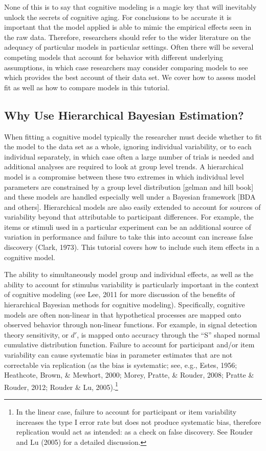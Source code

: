 \documentclass[
  english,
  ,man,floatsintext]{apa6}
\begin{document}
None of this is to say that cognitive modeling is a magic key that will inevitably unlock the secrets of cognitive aging. For conclusions to be accurate it is important that the model applied is able to mimic the empirical effects seen in the raw data. Therefore, researchers should refer to the wider literature on the adequacy of particular models in particular settings. Often there will be several competing models that account for behavior with different underlying assumptions, in which case researchers may consider comparing models to see which provides the best account of their data set. We cover how to assess model fit as well as how to compare models in this tutorial.

\hypertarget{why-use-hierarchical-bayesian-estimation}{%
\subsection{Why Use Hierarchical Bayesian Estimation?}\label{why-use-hierarchical-bayesian-estimation}}

When fitting a cognitive model typically the researcher must decide whether to fit the model to the data set as a whole, ignoring individual variability, or to each individual separately, in which case often a large number of trials is needed and additional analyses are required to look at group level trends. A hierarchical model is a compromise between these two extremes in which individual level parameters are constrained by a group level distribution {[}gelman and hill book{]} and these models are handled especially well under a Bayesian framework {[}BDA and others{]}. Hierarchical models are also easily extended to account for sources of variability beyond that attributable to participant differences. For example, the items or stimuli used in a particular experiment can be an additional source of variation in performance and failure to take this into account can increase false discovery (Clark, 1973). This tutorial covers how to include such item effects in a cognitive model.

The ability to simultaneously model group and individual effects, as well as the ability to account for stimulus variability is particularly important in the context of cognitive modeling (see Lee, 2011 for more discussion of the benefits of hierarchical Bayesian methods for cognitive modeling). Specifically, cognitive models are often non-linear in that hypothetical processes are mapped onto observed behavior through non-linear functions. For example, in signal detection theory sensitivity, or \(d'\), is mapped onto accuracy through the \enquote{S} shaped normal cumulative distribution function. Failure to account for participant and/or item variability can cause systematic bias in parameter estimates that are not correctable via replication (as the bias is systematic; see, e.g., Estes, 1956; Heathcote, Brown, \& Mewhort, 2000; Morey, Pratte, \& Rouder, 2008; Pratte \& Rouder, 2012; Rouder \& Lu, 2005).\footnote{In the linear case, failure to account for participant or item variability increases the type I error rate but does not produce systematic bias, therefore replication would act as intended: as a check on false discovery. See Rouder and Lu (2005) for a detailed discussion.}
\end{document}
